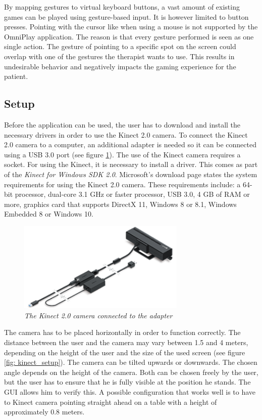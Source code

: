 By mapping gestures to virtual keyboard buttons, a vast amount of existing games can be played using gesture-based input. It is however limited to button presses. Pointing with the cursor like when using a mouse is not supported by the OmniPlay application. The reason is that every gesture performed is seen as one single action. The gesture of pointing to a specific spot on the screen could overlap with one of the gestures the therapist wants to use. This results in undesirable behavior and negatively impacts the gaming experience for the patient.\\


\subsection{Setup}

Before the application can be used, the user has to download and install the necessary drivers in order to use the Kinect 2.0 camera. To connect the Kinect 2.0 camera to a computer, an additional adapter is needed so it can be connected using a USB 3.0 port (see figure \ref{fig: kinect}). The use of the Kinect camera requires a socket. For using the Kinect, it is necessary to install a driver. This comes as part of the \emph{Kinect for Windows SDK 2.0}. Microsoft's download page \cite{KinectSDK} states the system requirements for using the Kinect 2.0 camera. These requirements include: a 64-bit processor, dual-core 3.1 GHz or faster processor, USB 3.0, 4 GB of RAM or more, graphics card that supports DirectX 11, Windows 8 or 8.1, Windows Embedded 8 or Windows 10.\\

\begin{figure}[H]
\begin{center}
\includegraphics[width=8cm]{KinectAdapter.png}
\caption{\emph{The Kinect 2.0 camera connected to the adapter}}
\label{fig: kinect}
\end{center}
\end{figure}

The camera has to be placed horizontally in order to function correctly. The distance between the user and the camera may vary between 1.5 and 4 meters, depending on the height of the user and the size of the used screen (see figure \ref{fig: kinect_setup}). The camera can be tilted upwards or downwards. The chosen angle depends on the height of the camera. Both can be chosen freely by the user, but the user has to ensure that he is fully visible at the position he stands. The GUI allows him to verify this. A possible configuration that works well is to have to Kinect camera pointing straight ahead on a table with a height of approximately 0.8 meters.\\

